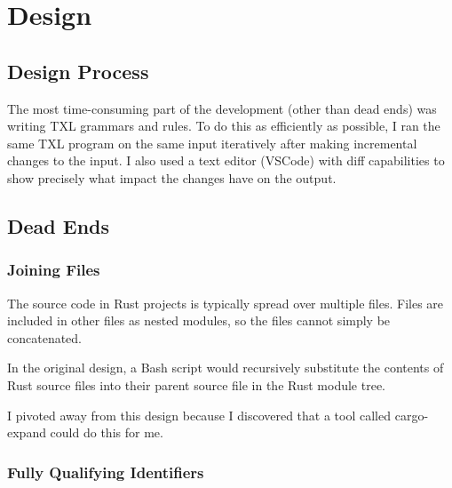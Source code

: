 \documentclass[11pt]{article}
\begin{document}




\section{Design}

\subsection{Design Process}
The most time-consuming part of the development (other than dead ends) was writing TXL grammars and rules.
To do this as efficiently as possible, I ran the same TXL program on the same input iteratively after making incremental changes to the input.
I also used a text editor (VSCode) with diff capabilities to show precisely what impact the changes have on the output.

\subsection{Dead Ends}

\subsubsection{Joining Files}
The source code in Rust projects is typically spread over multiple files.
Files are included in other files as nested modules, so the files cannot simply be concatenated.

In the original design, a Bash script would recursively substitute the contents of Rust source files into their parent source file in the Rust module tree.

I pivoted away from this design because I discovered that a tool called cargo-expand could do this for me.

\subsubsection{Fully Qualifying Identifiers}
\end{document}
